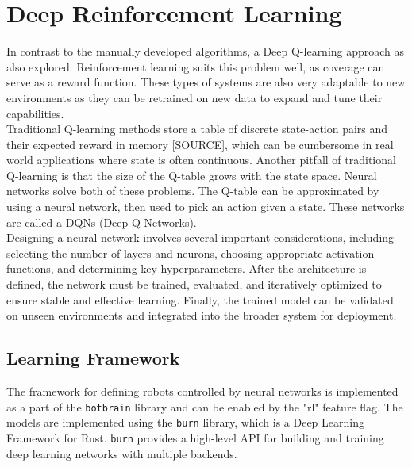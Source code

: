 \section{Deep Reinforcement Learning}
\label{sec:rl}
In contrast to the manually developed algorithms, a Deep Q-learning approach as also explored. Reinforcement learning suits this problem well, as coverage can serve as a reward function. These types of systems are also very adaptable to new environments as they can be retrained on new data to expand and tune their capabilities. \\

Traditional Q-learning methods store a table of discrete state-action pairs and their expected reward in memory {\color{red}[SOURCE]}, which can be cumbersome in real world applications where state is often continuous. Another pitfall of traditional Q-learning is that the size of the Q-table grows with the state space. Neural networks solve both of these problems. The Q-table can be approximated by using a neural network, then used to pick an action given a state. These networks are called a DQNs (Deep Q Networks). \\

Designing a neural network involves several important considerations, including selecting the number of layers and neurons, choosing appropriate activation functions, and determining key hyperparameters. After the architecture is defined, the network must be trained, evaluated, and iteratively optimized to ensure stable and effective learning. Finally, the trained model can be validated on unseen environments and integrated into the broader system for deployment.


\subsection{Learning Framework}
The framework for defining robots controlled by neural networks is implemented as a part of the \texttt{botbrain} library and can be enabled by the "rl" feature flag. The models are implemented using the \texttt{burn} \cite{burn} library, which is a Deep Learning Framework for Rust. \texttt{burn} provides a high-level API for building and training deep learning networks with multiple backends. \\

